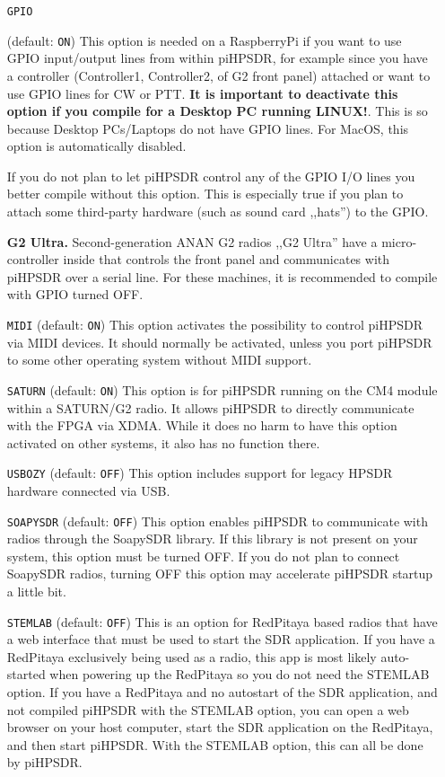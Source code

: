\documentclass[12pt]{book}
\def\rett#1{\texttt{\color{red}#1}}
\def\pH{pi\-HPSDR\xspace}
\begin{document}
\begin{itemize}
\item[\rett{GPIO}] {(default: \texttt{ON})
This option is needed on a RaspberryPi if you want to use GPIO input/output lines from
within \pH, for example since you have a controller (Controller1, Controller2, of G2 front panel)
attached or want to use GPIO lines for CW or PTT. \textbf{It is important to deactivate this option
if you compile for a Desktop PC running LINUX!}. This is so because Desktop PCs/Laptops do not
have GPIO lines. For MacOS, this option is automatically disabled.

If you do not plan to let \pH control any of the GPIO I/O lines you better compile without this option.
This is especially true if you plan to attach some third-party hardware (such as sound card ,,hats'')
to the GPIO.

{\bf G2 Ultra.} Second-generation ANAN G2 radios ,,G2 Ultra'' have a micro-controller inside that
controls the front panel and communicates with \pH over a serial line. For these machines, it is
recommended to compile with GPIO turned OFF.
}

\item[\rett{MIDI}] {(default: \texttt{ON})
This option activates the possibility to control \pH via MIDI devices. It should normally be
activated, unless you port \pH to some other operating system without MIDI support.
}

\item[\rett{SATURN}] {(default: \texttt{ON})
This option is for \pH running on the CM4 module within a SATURN/G2 radio. It allows
\pH to directly communicate with the FPGA via XDMA. While it does no harm to have this option activated
on other systems, it also has no function there.
}

\item[\rett{USBOZY}] {(default: \texttt{OFF})
This option includes support for legacy HPSDR hardware connected via USB.
}

\item[\rett{SOAPYSDR}] {(default: \texttt{OFF})
This option enables \pH to communicate with radios through the SoapySDR library. If this library
is not present on your system, this option must be turned OFF. If you do not plan to connect SoapySDR
radios, turning OFF this option may accelerate \pH startup a little bit.
}

\item[\rett{STEMLAB}] {(default: \texttt{OFF})
This is an option for RedPitaya based radios that have a web interface that must be used
to start the SDR application. If you have a RedPitaya exclusively being used as a radio, this
app is most likely auto-started when powering up the RedPitaya so you do not need the STEMLAB
option.
If you have a RedPitaya and no autostart of the SDR application, and not compiled \pH
with the STEMLAB option, you can open a web browser on your host computer, start the SDR application on the RedPitaya,
and then start \pH. With the STEMLAB option, this can all be done by \pH.
}


\end{itemize}
\end{document}
